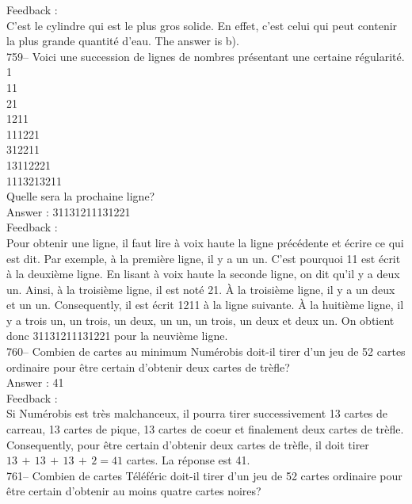 \documentclass[letterpaper, 12pt]{article}
\begin{document}
Feedback : \\
C'est le cylindre qui est le plus gros solide. En effet, c'est celui qui
peut contenir la plus grande quantit\'e d'eau.  The answer is b).\\

759-- Voici une succession de lignes de nombres pr\'esentant une certaine
r\'egularit\'e.  \\
1\\
11\\
21\\
1211\\
111221\\
312211\\
13112221\\
1113213211\\

Quelle sera la prochaine ligne?\\

Answer : 31131211131221\\

Feedback : \\
Pour obtenir une ligne, il faut lire \`a voix haute la ligne pr\'ec\'edente
et \'ecrire ce qui est dit.  Par exemple, \`a la premi\`ere ligne, il y a un
un.  C'est pourquoi 11 est \'ecrit \`a la deuxi\`eme ligne. En lisant \`a
voix haute la seconde ligne, on dit qu'il y a deux un.  Ainsi, \`a la
troisi\`eme ligne, il est not\'e 21.  \`A la troisi\`eme ligne, il y a un
deux et un un.  Consequently, il est \'ecrit 1211 \`a la ligne suivante.
  \`A la huiti\`eme ligne, il y a trois un, un trois, un deux, un un, un
trois, un deux et deux un. On obtient donc 31131211131221 pour la neuvi\`eme
ligne.\\


760--  Combien de cartes au minimum Num\'erobis doit-il tirer d'un jeu de 52
cartes ordinaire pour \^etre certain d'obtenir deux cartes de tr\`efle?\\

Answer : 41\\

Feedback : \\
Si Num\'erobis est tr\`es malchanceux, il pourra tirer successivement 13
cartes de carreau, 13 cartes de pique, 13 cartes de coeur et finalement deux
cartes de tr\`efle.  Consequently, pour \^etre certain d'obtenir deux
cartes de tr\`efle, il doit tirer $13\,+\,13\,+\,13\,+\,2=41$ cartes.  La
r\'eponse est 41.\\

761-- Combien de cartes T\'el\'ef\'eric doit-il tirer d'un jeu de 52 cartes
ordinaire pour \^etre certain d'obtenir au moins quatre cartes noires?\\
\end{document}
